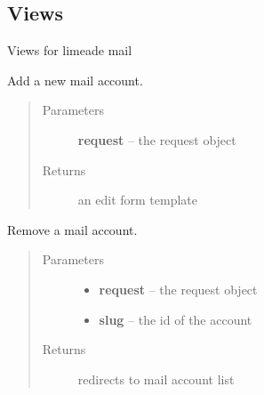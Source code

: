 \documentclass[letterpaper,10pt,english]{sphinxmanual}
\begin{document}
\subsection{Views}
\label{api/mail:module-limeade.mail.views}\label{api/mail:views}
Views for limeade mail

\begin{fulllineitems}
\label{api/mail:limeade.mail.views.account_add}
Add a new mail account.
\begin{quote}\begin{description}
\item[{Parameters}] \leavevmode
\textbf{request} -- the request object

\item[{Returns}] \leavevmode
an edit form template

\end{description}\end{quote}

\end{fulllineitems}


\begin{fulllineitems}
\label{api/mail:limeade.mail.views.account_delete}
Remove a mail account.
\begin{quote}\begin{description}
\item[{Parameters}] \leavevmode\begin{itemize}
\item {} 
\textbf{request} -- the request object

\item {} 
\textbf{slug} -- the id of the account

\end{itemize}

\item[{Returns}] \leavevmode
redirects to mail account list

\end{description}\end{quote}

\end{fulllineitems}
\end{document}
